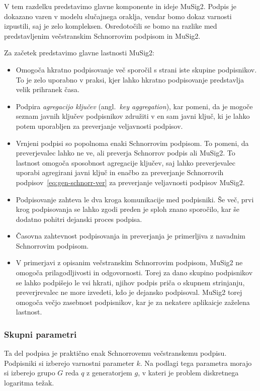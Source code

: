 V tem razdelku predstavimo glavne komponente in ideje MuSig2. Podpis je dokazano varen v modelu
slučajnega oraklja, vendar bomo dokaz varnosti izpustili, saj je zelo kompleksen. Osredotočili se
bomo na razlike med predstavljenim večstranskim Schnorrovim podpisom in MuSig2.

Za začetek predstavimo glavne lastnosti MuSig2:
\begin{itemize}
    \item Omogoča hkratno podpisovanje več sporočil s strani iste skupine podpisnikov. To je zelo
        uporabno v praksi, kjer lahko hkratno podpisovanje predstavlja velik prihranek časa.
    \item Podpira \textit{agregacijo ključev} (angl.\ \textit{key aggregation}), kar pomeni, da je
        mogoče seznam javnih ključev podpisnikov združiti v en sam javni ključ, ki je lahko potem
        uporabljen za preverjanje veljavnosti podpisov.
    \item Vrnjeni podpisi so popolnoma enaki Schnorrovim podpisom. To pomeni, da preverjevalec lahko
        ne ve, ali preverja Schnorrov podpis ali MuSig2. To lastnost omogoča sposobnost agregacije
        ključev, saj lahko preverjevalec uporabi agregirani javni ključ in enačbo za preverjanje
        Schnorrovih podpisov~\eqref{eq:gen-schnorr-ver} za preverjanje veljavnosti podpisov MuSig2.
    \item Podpisovanje zahteva le dva kroga komunikacije med podpisniki. Še več, prvi krog podpisovanja
        se lahko zgodi preden je sploh znano sporočilo, kar še dodatno pohitri dejanski proces podpisa.
    \item Časovna zahtevnost podpisovanja in preverjanja je primerljiva z navadnim Schnorrovim
        podpisom.
    \item V primerjavi z opisanim večstranskim Schnorrovim podpisom, MuSig2 ne omogoča prilagodljivosti
        in odgovornosti. Torej za dano skupino podpisnikov se lahko podpišejo le vsi hkrati, njihov
        podpis priča o skupnem strinjanju, preverjrevalec ne more izvedeti, kdo je dejansko podpisoval.
        MuSig2 torej omogoča večjo zasebnost podpisnikov, kar je za nekatere aplikaicje zaželena lastnost.
\end{itemize}

\subsubsection{Skupni parametri}
Ta del podpisa je praktično enak Schnorrovemu večstranskemu podpisu. Podpisniki si izberejo varnostni
parameter $k$. Na podlagi tega parametra morajo si izberejo grupo $G$ reda $q$ z generatorjem $g$, v
kateri je problem diskretnega logaritma težak.

